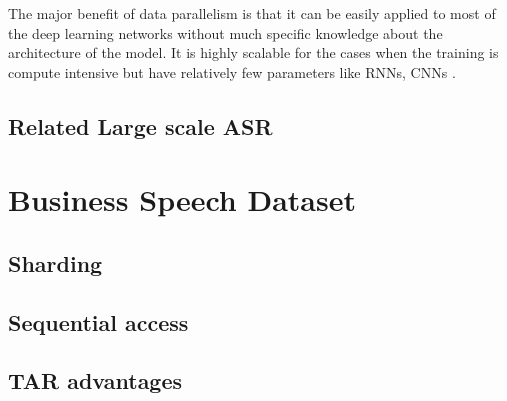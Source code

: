 The major benefit of data parallelism is that it can be easily applied to most of the deep learning networks without much specific knowledge about the architecture of the model. It is highly scalable for the cases when the training is compute intensive but have relatively few parameters like RNNs, CNNs \cite{Krizhevsky2014OneNetworks}.

\subsection{Related Large scale ASR}

\section{Business Speech Dataset}

\subsection{Sharding}
\subsection{Sequential access}
\subsection{TAR advantages}
